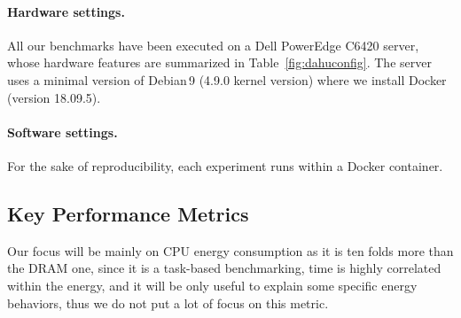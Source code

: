 \paragraph{Hardware settings.}
All our benchmarks have been executed on a Dell PowerEdge C6420 server, whose hardware features are summarized in Table~\ref{fig:dahuconfig}.
The server uses a minimal version of Debian\,9 (4.9.0 kernel version) where we install Docker (version 18.09.5).

\begin{table}[hbt]
      \caption{Benchmarking server configuration.}
      \label{fig:dahuconfig}
\end{table}

\paragraph{Software settings.}
For the sake of reproducibility, each experiment runs within a Docker container.
\subsection{Key Performance Metrics}
Our focus will be mainly on CPU energy consumption as it is ten folds more than the DRAM one, since it is a task-based benchmarking, time is highly correlated within the energy, and it will be only useful to explain some specific energy behaviors, thus we do not put a lot of focus on this metric.

